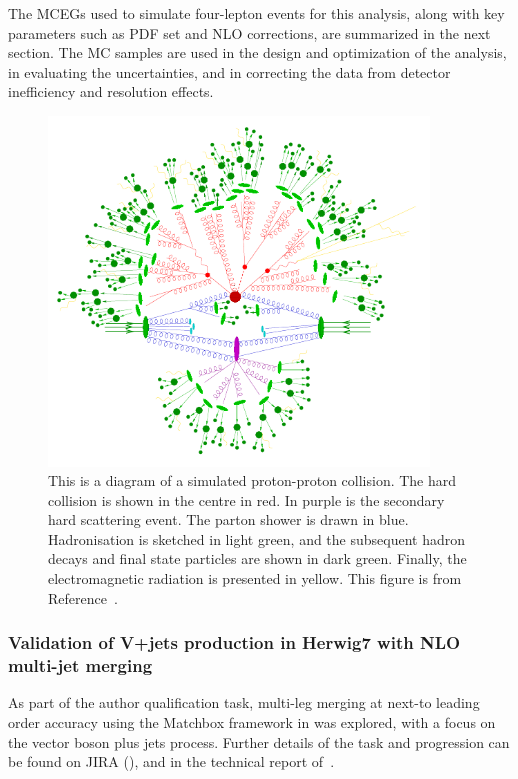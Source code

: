 The MCEGs used to simulate four-lepton events for this analysis, along with key parameters such as PDF set and NLO corrections, are summarized in the next section. The MC samples are used in the design and optimization of the analysis, in evaluating the uncertainties, and in correcting the data from detector inefficiency and resolution effects.

\begin{figure}[htb!]
    \centering
    \includegraphics[width=0.90\textwidth]{Figures/LHC/HocheMCEG_final.pdf}
    \caption{This is a diagram of a simulated proton-proton collision. The hard collision is shown in the centre in red. In purple is the secondary hard scattering event. The parton shower is drawn in blue. Hadronisation is sketched in light green, and the subsequent hadron decays and final state particles are shown in dark green. Finally, the electromagnetic radiation is presented in yellow. This figure is from Reference~\cite{hoche2015introduction}.}
    \label{fig:MCEG}
\end{figure}

\subsubsection{Validation of V+jets production in Herwig7 with NLO multi-jet merging}
As part of the \ATLAS author qualification task, multi-leg merging at next-to leading order accuracy using the Matchbox framework in  was explored, with a focus on the vector boson plus jets process. Further details of the task and progression can be found on JIRA (\href{https://its.cern.ch/jira/browse/AGENE-1453}{\code{\textcolor{blue}{AGENE-1453}}}), and in the technical report of~\cite{Huang:2676143}.

